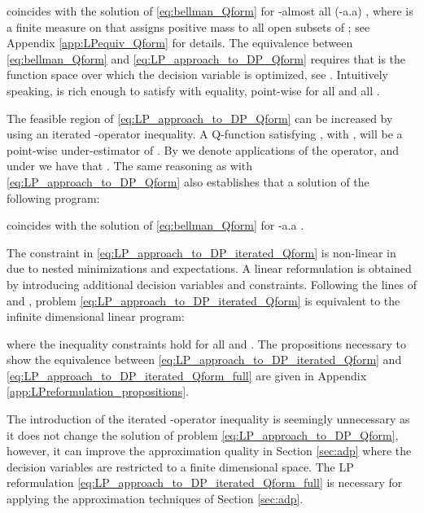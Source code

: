 \documentclass[journal]{IEEEtran}
\newcommand{\textQ}{Q}
\begin{document}
coincides with the solution of \eqref{eq:bellman_Qform} for -almost all (-a.a) , where  is a finite measure on  that assigns positive mass to all open subsets of ; see Appendix \ref{app:LPequiv_Qform} for details.
The equivalence between \eqref{eq:bellman_Qform} and \eqref{eq:LP_approach_to_DP_Qform} requires that  is the function space over which the decision variable  is optimized, see \cite[\S 6.3]{hernandez_2012_discreteTimeMCP}. Intuitively speaking,  is rich enough to satisfy  with equality, point-wise for all  and all .


The feasible region of \eqref{eq:LP_approach_to_DP_Qform} can be increased by using an iterated -operator inequality.
A \textQ-function satisfying , with , will be a point-wise under-estimator of .
By  we denote  applications of the  operator, and under \cite[Assumptions 4.2.1(a), 4.2.1(b), 4.2.2]{hernandez_2012_discreteTimeMCP} we have that .
The same reasoning as with \eqref{eq:LP_approach_to_DP_Qform} also establishes that a solution of the following program:
	
coincides with the solution of \eqref{eq:bellman_Qform} for -a.a .



The constraint in \eqref{eq:LP_approach_to_DP_iterated_Qform} is non-linear in  due to nested minimizations and expectations. A linear reformulation is obtained by introducing additional decision variables and constraints. Following the lines of \cite[Theorem 2]{vanroy_decentADP} and \cite[\S 3.4]{boyd_iteratedBellman}, problem \eqref{eq:LP_approach_to_DP_iterated_Qform} is equivalent to the infinite dimensional linear program:

where the inequality constraints hold for all  and .
The propositions necessary to show the equivalence between \eqref{eq:LP_approach_to_DP_iterated_Qform} and \eqref{eq:LP_approach_to_DP_iterated_Qform_full} are given in Appendix \ref{app:LPreformulation_propositions}.




The introduction of the iterated -operator inequality is seemingly unnecessary as it does not change the solution of problem \eqref{eq:LP_approach_to_DP_Qform}, however, it can improve the approximation quality in Section \ref{sec:adp} where the decision variables are restricted to a finite dimensional space.
The LP reformulation \eqref{eq:LP_approach_to_DP_iterated_Qform_full} is necessary for applying the approximation techniques of Section \ref{sec:adp}.


\vspace{0.1cm}
\end{document}
